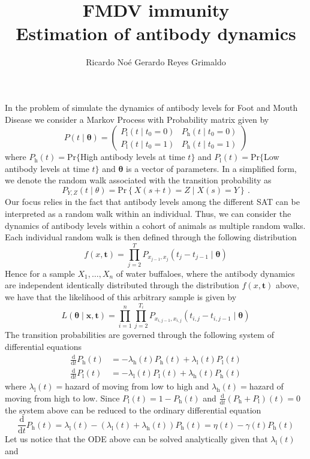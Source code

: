 \documentclass[11pt,letterpaper]{amsart}
\title[FMDV immunity]{FMDV immunity\\Estimation of antibody dynamics}
\author{Ricardo No\'e Gerardo Reyes Grimaldo}
\newcommand{\bes}{\begin{equation*}}
\newcommand{\ees}{\end{equation*}}
\newcommand{\beq}{\begin{equation}}
\newcommand{\eeq}{\end{equation}}
\newcommand{\barr}{\begin{array}}
\newcommand{\earr}{\end{array}}
\newcommand{\Prm}{\mathrm{Pr}}
\newcommand{\diff}[2]{\frac{\mathrm {#1}}{\mathrm{#1}#2}}
\newcommand{\rl}{\mathrm{l}}
\newcommand{\rh}{\mathrm{h}}
\theoremstyle{plain}
\theoremstyle{definition}
\theoremstyle{remark}
\begin{document}
\maketitle
In the problem of simulate the dynamics of antibody levels for Foot and Mouth Disease we 
consider a Markov Process with Probability matrix given by 
\bes
P(t\mid \pmb{\theta})=\left(\barr{cc}P_\rl(t\mid t_0=0)&P_\rh(t\mid t_0=0)\\
P_\rl(t\mid t_0=1)&P_\rh(t\mid t_0=1)\earr\right)
\ees
where $P_\rh(t)=\Prm\{$High antibody levels at time $t\}$ and $P_\rl(t)=\Prm\{$Low antibody 
levels at 
time $t\}$ and $\pmb{\theta}$ is a vector of parameters. In a simplified form, we denote 
the random walk associated with the transition probability as 
\bes
P_{Y,Z}(t\mid \textbf{$\theta$})=\Prm\left\{X(s+t)=Z\mid X(s)=Y\right\}\,.
\ees
Our focus relies in the fact that antibody levels among the different SAT can be interpreted 
as a random walk within an individual. Thus, we can consider the dynamics of antibody levels 
within a cohort of animals as multiple random walks. Each individual random walk is then 
defined through the following distribution
\bes
f(x,\textbf{t})=\prod_{j=2}^TP_{x_{j-1},x_{j}}(t_j-t_{j-1}\mid\pmb{\theta})
\ees
Hence for a sample $X_1,\dots,X_n$ of water buffaloes, where the antibody dynamics are 
independent identically distributed through the distribution $f(x,\textbf{t})$ above, we 
have  that the likelihood of this arbitrary sample is given by 
\beq
L(\pmb{\theta}\mid \textbf{x},\textbf{t})=\prod_{i=1}^{n}\prod_{j=2}^{T_i}
P_{x_{i,j-1},x_{i,j}}(t_{i,j}-t_{i,j-1}\mid\pmb{\theta})\label{likelihood}
\eeq
The transition probabilities are governed through the following system of differential 
equations
\bes\begin{split}
\diff{d}{t} P_\rh(t)&=-\lambda_\rh(t)P_\rh(t)+\lambda_\rl(t)P_\rl(t)\\
\diff{d}{t} P_\rl(t)&=-\lambda_\rl(t)P_\rl(t)+\lambda_\rh(t)P_\rh(t)
\end{split}\ees
where $\lambda_\rl(t)=$hazard of moving from low to high and $\lambda_\rh(t)=$hazard of moving 
from high to low. Since $P_\rl(t)=1-P_\rh(t)$ and $\displaystyle\diff{d}{t}(P_\rh+P_\rl)(t)=0$ 
the system above can be reduced to the ordinary differential equation
\bes
\diff{d}{t}P_\rh(t)=\lambda_\rl(t)-(\lambda_\rl(t)+\lambda_\rh(t))P_\rh(t)=\eta(t)-\gamma(t)
P_\rh(t)
\ees
Let us notice that the ODE above can be solved analytically given that $\lambda_\rl(t)$ and 
\end{document}
